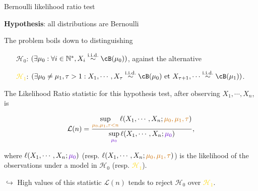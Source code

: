 \documentclass[11pt,english,ignorenonframetext,]{beamer}
\begin{document}
\begin{frame}{Bernoulli likelihood ratio test}

  \textbf{Hypothesis}: all distributions are Bernoulli

  The problem boils down to distinguishing
  \begin{itemize}
    \item[\textcolor{deeppurple}{$\mathcal{H}_0$}:]
    \textcolor{deeppurple}{$(\exists \mu_0 : \forall i\in\mathbb{N}^*, X_i \overset{\text{i.i.d.}}{\sim} \cB(\mu_0))$},
    against the alternative
    \item[\textcolor{gold}{$\mathcal{H}_1$}:]
    \textcolor{gold}{$(\exists \mu_0 \neq \mu_1, \tau > 1 : X_1, \cdots, X_\tau \overset{\text{i.i.d.}}{\sim} \cB(\mu_0) \text{~et~} X_{\tau+1}, \cdots \overset{\text{i.i.d.}}{\sim} \cB(\mu_1))$}.
  \end{itemize}

  \pause

  The \alert{Likelihood Ratio statistic} for this hypothesis test, after observing $X_1,\cdots,X_n$, is
  \begin{small}
    \[ \mathcal{L}(n) = \frac{\sup\limits_{\textcolor{gold}{\mu_0,\mu_1,\tau < n}}\ell(X_1,\cdots,X_n ; \textcolor{gold}{\mu_0,\mu_1,\tau})}{\sup\limits_{\textcolor{deeppurple}{\mu_0}}\ell(X_1,\cdots,X_n ;\textcolor{deeppurple}{\mu_0})},\]
  \end{small}
  where $\ell(X_1,\cdots,X_n ; \textcolor{deeppurple}{\mu_0})$ (resp. $\ell(X_1,\cdots,X_n ; \textcolor{gold}{\mu_0,\mu_1,\tau})$) is the likelihood of the observations under a model in \textcolor{deeppurple}{$\mathcal{H}_0$} (resp. \textcolor{gold}{$\mathcal{H}_1$}).

  \pause

  \alert{$\hookrightarrow$ High values of this statistic $\mathcal{L}(n)$ tends to reject \textcolor{deeppurple}{$\mathcal{H}_0$} over \textcolor{gold}{$\mathcal{H}_1$}.}

\end{frame}
\end{document}
